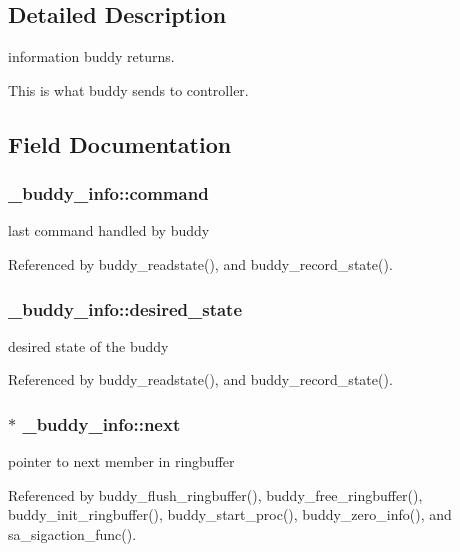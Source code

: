 \subsection{Detailed Description}
information buddy returns. 

This is what buddy sends to controller. 

\subsection{Field Documentation}
\subsubsection[{command}]{ {\bf \_\-buddy\_\-info::command}}\label{struct__buddy__info_a411cde42d2b5345a711f9c10888e1198}
last command handled by buddy 

Referenced by buddy\_\-readstate(), and buddy\_\-record\_\-state().

\subsubsection[{desired\_\-state}]{ {\bf \_\-buddy\_\-info::desired\_\-state}}\label{struct__buddy__info_ab0dbf45adc70df2fef1f709781873d5a}
desired state of the buddy 

Referenced by buddy\_\-readstate(), and buddy\_\-record\_\-state().

\subsubsection[{next}]{ $\ast$ {\bf \_\-buddy\_\-info::next}}\label{struct__buddy__info_a89ec8f08886386f79f6ad0f856470a18}
pointer to next member in ringbuffer 

Referenced by buddy\_\-flush\_\-ringbuffer(), buddy\_\-free\_\-ringbuffer(), buddy\_\-init\_\-ringbuffer(), buddy\_\-start\_\-proc(), buddy\_\-zero\_\-info(), and sa\_\-sigaction\_\-func().

